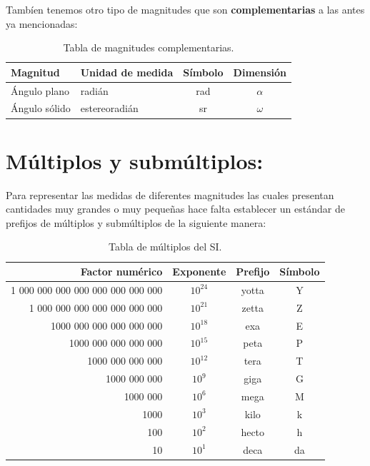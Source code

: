 Tambíen tenemos otro tipo de magnitudes que son \textbf{complementarias} a las antes ya mencionadas:

\begin{table}[H]
 \begin{center}
 \begin{tabular}{llcc}
 \hline
Magnitud & Unidad de medida & Símbolo & Dimensión\\
\hline
Ángulo plano & radián & rad & $\alpha$ \\
Ángulo sólido & estereoradián & sr & $\omega$ \\
\hline
 \end{tabular}
 \caption{Tabla de magnitudes complementarias.}
 \end{center}
\end{table}

\section{Múltiplos y submúltiplos:}

Para representar las medidas de diferentes magnitudes las cuales presentan cantidades muy grandes o muy pequeñas hace falta 
establecer un estándar de prefijos de múltiplos y submúltiplos de la siguiente manera:

\begin{table}[H]
 \begin{center}
\begin{tabular}{rccc}
\hline
Factor numérico & Exponente & Prefijo & Símbolo\\
\hline
1 000 000 000 000 000 000 000 000 & $10^{24}$ & yotta & Y \\
1 000 000 000 000 000 000 000 & $10^{21}$ & zetta & Z \\
1000 000 000 000 000 000 & $10^{18}$ & exa & E\\
1000 000 000 000 000 & $10^{15}$ & peta & P\\
1000 000 000 000 & $10^{12}$ & tera & T\\
1000 000 000 & $10^{9}$ & giga & G\\
1000 000 & $10^{6}$ & mega  & M\\
1000 &$10^{3}$ & kilo & k\\
100 & $10^{2}$ & hecto & h\\
10 & $10^{1}$  & deca & da\\
\hline
\end{tabular}
\caption{Tabla de múltiplos del SI.}
 \end{center}
\end{table}
 
